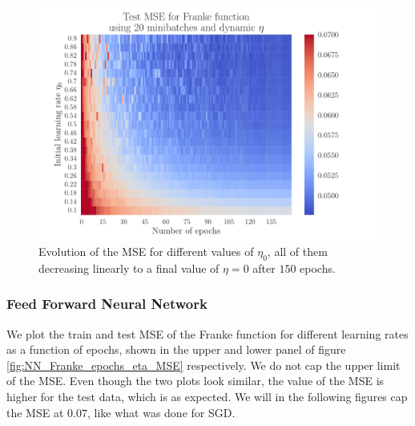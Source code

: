 \documentclass[12pt]{extarticle}
\begin{document}
\begin{figure}[h!]
	\includegraphics[width=0.9\linewidth]{SGD_Franke/reg_Franke__epochs_dynamic_eta__Test_MSE__792536.pdf}
	\caption{Evolution of the MSE for different values of $\eta_0$, all of them decreasing linearly to a final value of $\eta=0$ after $150$ epochs.}
	\label{fig:SGD_Franke_epochs_dynamic_eta}
\end{figure}


\subsubsection{Feed Forward Neural Network}

We plot the train and test MSE of the Franke function for different learning rates as a function of epochs, shown in the upper and lower panel of figure \ref{fig:NN_Franke_epochs_eta_MSE} respectively. We do not cap the upper limit of the MSE. Even though the two plots look similar, the value of the MSE is higher for the test data, which is as expected. We will in the following figures cap the MSE at $0.07$, like what was done for SGD.
\end{document}
